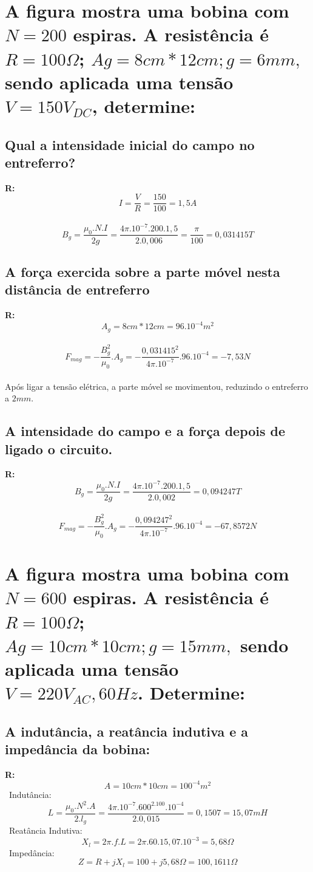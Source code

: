 \documentclass{article}
\begin{document}
\section{A figura mostra uma bobina com \(N=200\) espiras. A resistência é \(R=100\Omega\); \(Ag=8cm*12cm; g= 6mm,\) sendo aplicada uma tensão \(V=150V_{DC}\), determine:}

\subsection{Qual a intensidade inicial do campo no entreferro?}
\textbf{R:}
\[I=\frac{V}{R} = \frac{150}{100} = 1,5A\]\
\[B_{g}=\frac{\mu_{0}.N.I}{2g} = \frac{4\pi.10^{-7}.200.1,5}{2.0,006} = \frac{\pi}{100} = 0,031415T\]

\subsection{A força exercida sobre a parte móvel nesta distância de entreferro}
\textbf{R:}
\[A_{g}=8cm*12cm = 96.10^{-4}m^2\]\
\[F_{mag} = -\frac{B_{g}^{2}}{\mu_{0}}.A_{g} = -\frac{0,031415^2}{4\pi.10^{-7}}.96.10^{-4} = - 7,53N\]\\
Após ligar a tensão elétrica, a parte móvel se movimentou, reduzindo o entreferro a \(2mm\).

\subsection{A intensidade do campo e a força depois de ligado o circuito.}
\textbf{R:}
\[B_{g}=\frac{\mu_{0}.N.I}{2g} = \frac{4\pi.10^{-7}.200.1,5}{2.0,002} = 0,094247T\]\
\[F_{mag} = -\frac{B_{g}^{2}}{\mu_{0}}.A_{g} = -\frac{0,094247^2}{4\pi.10^{-7}}.96.10^{-4} = -67,8572N \]

\section{A figura mostra uma bobina com \(N=600\) espiras. A resistência é \(R=100\Omega\); \(Ag=10cm*10cm; g= 15mm,\) sendo aplicada uma tensão \(V=220V_{AC}, 60Hz\). Determine:}

\subsection{A indutância, a reatância indutiva e a impedância da bobina:}
\textbf{R:}
\[A=10cm*10cm = 100^{-4}m^2\]\
Indutância: \[L=\frac{\mu_{0}.N^2.A}{2.l_g} = \frac{4\pi.10^{-7}.600^2.100.10^{-4}}{2.0,015} = 0,1507 = 15,07mH\]\
Reatância Indutiva: \[X_l=2\pi.f.L = 2\pi.60.15,07.10^{-3} = 5,68\Omega\]\
Impedância: \[Z = R + jX_l = 100 + j5,68\Omega = 100,1611\Omega\] 
\end{document}
